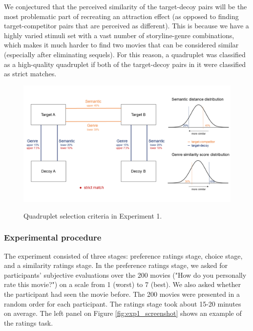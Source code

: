 \documentclass[11pt,a4paper]{article}
\begin{document}
 We conjectured that the perceived similarity of the target-decoy pairs will be the most problematic part of recreating an attraction effect (as opposed to finding target-competitor pairs that are perceived as different). This is because we have a highly varied stimuli set with a vast number of storyline-genre combinations, which makes it much harder to find two movies that can be considered similar (especially after eliminating sequels). For this reason, a quadruplet was classified as a high-quality quadruplet if both of the target-decoy pairs in it were classified as strict matches.


\cleardoublepage
{}
\begin{landscape}
\begin{figure}
\caption{Quadruplet selection criteria in Experiment 1.}
\includegraphics[width=1.45\textwidth]{diagram.png}
\label{fig:diag}
\end{figure}
\end{landscape}
\cleardoublepage
{}
\setcounter{page}{\thesavepage}
\restoregeometry
 






\subsubsection{Experimental procedure}  \label{experiment_proced}


The experiment consisted of three stages: preference ratings stage, choice stage, and a similarity ratings stage. In the preference ratings stage, we asked for participants' subjective evaluations over the 200 movies ("How do you personally rate this movie?") on a scale from 1 (worst) to 7 (best). We also asked whether the participant had seen the movie before. The 200 movies were presented in a random order for each participant. The ratings stage took about 15-20 minutes on average. The left panel on Figure \ref{fig:exp1_screenshot} shows an example of the ratings task.
\end{document}
